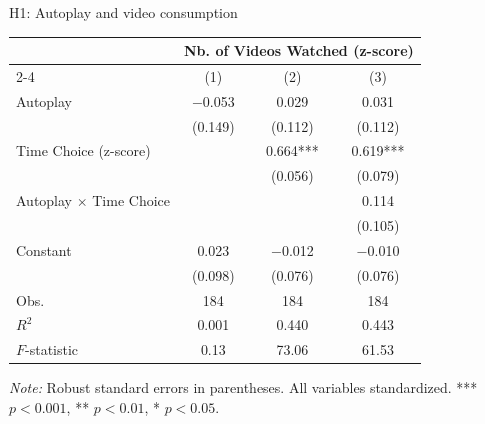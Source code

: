 \documentclass[aspectratio=169,xcolor=dvipsnames]{beamer}
\renewcommand{\footnotesize}{\fontsize{8pt}{11pt}\selectfont}
\begin{document}
\begin{frame}{H1: Autoplay and video consumption}
  \begin{table}
    \centering
    \footnotesize  %
    \begin{threeparttable}
      \begin{tabular*}{0.8\textwidth}{@{\extracolsep{\fill}}lccc@{}}
        \toprule
        & \multicolumn{3}{c}{Nb. of Videos Watched (z-score)} \\
        \cmidrule(lr){2-4}
        & (1) & (2) & (3) \\
        \midrule
        Autoplay & $-$0.053 & 0.029 & 0.031 \\
        & (0.149) & (0.112) & (0.112) \\
        Time Choice (z-score) & & 0.664*** & 0.619*** \\
        & & (0.056) & (0.079) \\
        Autoplay $\times$ Time Choice & & & 0.114 \\
        & & & (0.105) \\
        Constant & 0.023 & $-$0.012 & $-$0.010 \\
        & (0.098) & (0.076) & (0.076) \\
        \midrule
        Obs. & 184 & 184 & 184 \\
        $R^2$ & 0.001 & 0.440 & 0.443 \\
        $F$-statistic & 0.13 & 73.06 & 61.53 \\
        \bottomrule
      \end{tabular*}
      \begin{tablenotes}[flushleft]
        \tiny  %
        \item[] \textit{Note:} Robust standard errors in parentheses. All variables standardized. *** $p<0.001$, ** $p<0.01$, * $p<0.05$.
      \end{tablenotes}
      \label{tab:videos_regressions}
    \end{threeparttable}
  \end{table}
\end{frame}
\end{document}
